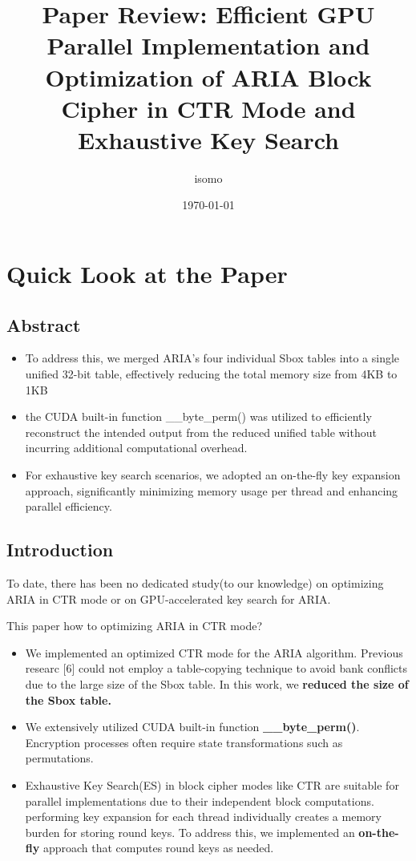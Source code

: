 \documentclass[a4paper]{article}
\title{Paper Review: Efficient GPU Parallel Implementation and Optimization of ARIA Block Cipher in CTR Mode and Exhaustive Key Search}
\author{isomo}
\date{\today}
\begin{document}
\maketitle

\section{Quick Look at the Paper}

\subsection*{Abstract}

\begin{itemize}
  \item To address this, we merged ARIA’s four individual Sbox tables into a single unified 32-bit table, effectively reducing the total memory size from 4KB to 1KB
  \item  the CUDA built-in function \_\_byte\_perm() was utilized to efficiently reconstruct the intended output from the reduced unified table without incurring additional computational overhead.
  \item For exhaustive key search scenarios, we adopted an on-the-fly key expansion approach, significantly minimizing memory usage per thread and enhancing parallel efficiency.
\end{itemize}

\subsection{Introduction}

To date, there has been no dedicated study(to our knowledge) on optimizing ARIA in CTR mode or on GPU-accelerated key search for ARIA.

\begin{note}
  This paper how to  optimizing ARIA in CTR mode?
\end{note}

\begin{itemize}
  \item We implemented an optimized CTR mode for the ARIA algorithm. Previous researc [6] could not employ a table-copying technique to avoid bank conflicts due to the large size of the Sbox table. In this work, we \textbf{reduced the size of the Sbox table.}
  \item We extensively utilized CUDA built-in function \textbf{\_\_byte\_perm()}. Encryption processes often require state transformations such as permutations.
  \item Exhaustive Key Search(ES) in block cipher modes like CTR are suitable for parallel implementations due to their independent block computations. performing key expansion for each thread individually creates a memory burden for storing round keys. To address this, we implemented an \textbf{on-the-fly} approach that computes round keys as needed.
\end{itemize}
\end{document}
